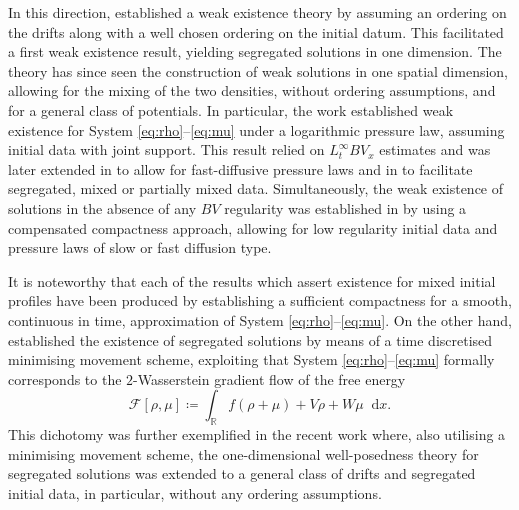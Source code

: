\documentclass[a4paper,twosided, 11pt]{article}
\newcommand{\R}{\mathbb{R}}
\theoremstyle{plain}
\theoremstyle{remark}
\newcommand{\diff}{\mathop{} \mathrm{d}}
\numberwithin{equation}{section}
\begin{document}
\medskip 


In this direction, \cite{MeszarosKim2018} established a weak existence theory by assuming an ordering on the drifts along with a well chosen ordering on the initial datum.
This facilitated a first weak existence result, yielding segregated solutions in one dimension. 
The theory has since seen the construction of weak solutions in one spatial dimension, allowing for the mixing of the two densities, without ordering assumptions, and for a general class of potentials.
In particular, the work \cite{2025arXiv250418484M} established weak existence for System \eqref{eq:rho}--\eqref{eq:mu} under a logarithmic pressure law, assuming initial data with joint support. 
This result relied on $L^\infty_tBV_x$ estimates and was later extended in \cite{ElbarSantambrogio25} to allow for fast-diffusive pressure laws and in \cite{MeszarosParker26} to facilitate segregated, mixed or partially mixed data.
Simultaneously, the weak existence of solutions in the absence of any $BV$ regularity was established in \cite{Skrzeczkowski2026crossdiffusion} by using a compensated compactness approach, allowing for low regularity initial data and pressure laws of slow or fast diffusion type.

\medskip 

It is noteworthy that each of the results which assert existence for mixed initial profiles \cite{2025arXiv250418484M, ElbarSantambrogio25,MeszarosParker26,Skrzeczkowski2026crossdiffusion} have been produced by establishing a sufficient compactness for a smooth, continuous in time, approximation of System \eqref{eq:rho}--\eqref{eq:mu}. 
On the other hand, \cite{MeszarosKim2018} established the existence of segregated solutions by means of a time discretised minimising movement scheme, exploiting that System \eqref{eq:rho}--\eqref{eq:mu} formally corresponds to the $2$-Wasserstein gradient flow of the free energy 
\begin{equation}\label{eq:freeenergy}
 \mathcal{F}[\rho,\mu] \coloneqq \int_{\R} f(\rho+ \mu) + V \rho + W \mu \diff x.   
\end{equation}
This dichotomy was further exemplified in the recent work
\cite{santambrogioschulz2026segregated} where, also utilising a minimising movement scheme, the one-dimensional well-posedness theory for segregated solutions was extended to a general class of drifts and segregated initial data, in particular, without any ordering assumptions. 

\medskip 
\end{document}
